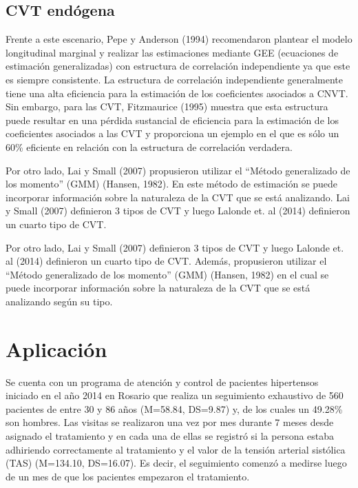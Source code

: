 \documentclass[spanish]{article}
\numberwithin{figure}{subsection}
\numberwithin{equation}{subsection}
\numberwithin{table}{subsection}
\def\npatients{560}
\begin{document}
\subsection{CVT endógena}

Frente a este escenario, Pepe y Anderson (1994) recomendaron plantear el modelo
longitudinal marginal y realizar las estimaciones mediante GEE (ecuaciones de
estimación generalizadas) con estructura de correlación independiente ya que
este es siempre consistente. La estructura de correlación independiente
generalmente tiene una alta eficiencia para la estimación de los coeficientes
asociados a CNVT. Sin embargo, para las CVT, Fitzmaurice (1995) muestra que esta
estructura puede resultar en una pérdida sustancial de eficiencia para la
estimación de los coeficientes asociados a las CVT y proporciona un ejemplo en
el que es sólo un 60\% eficiente en relación con la estructura de correlación
verdadera.

Por otro lado, Lai y Small (2007) propusieron utilizar el ``Método generalizado
de los momento'' (GMM) (Hansen, 1982). En este método de estimación se puede
incorporar información sobre la naturaleza de la CVT que se está analizando. Lai
y Small (2007) definieron 3 tipos de CVT y luego Lalonde et. al (2014)
definieron un cuarto tipo de CVT.

Por otro lado, Lai y Small (2007) definieron 3 tipos de CVT y luego Lalonde et.
al (2014) definieron un cuarto tipo de CVT. Además, propusieron utilizar el
``Método generalizado de los momento'' (GMM) (Hansen, 1982) en el cual se puede
incorporar información sobre la naturaleza de la CVT que se está analizando
según su tipo.

\newpage

\section{Aplicación}

Se cuenta con un programa de atención y control de pacientes hipertensos
iniciado en el año 2014 en Rosario que realiza un seguimiento exhaustivo de
\npatients{} pacientes de entre 30 y 86 años (M=58.84, DS=9.87) y, de los cuales
un 49.28\% son hombres. Las visitas se realizaron una vez por mes durante 7
meses desde asignado el tratamiento y en cada una de ellas se registró si la
persona estaba adhiriendo correctamente al tratamiento y el valor de la tensión
arterial sistólica (TAS) (M=134.10, DS=16.07). Es decir, el seguimiento comenzó
a medirse luego de un mes de que los pacientes empezaron el tratamiento.
\end{document}
